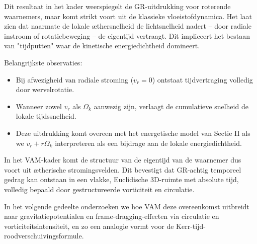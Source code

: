 Dit resultaat in het kader weerspiegelt de GR-uitdrukking voor roterende waarnemers, maar komt strikt voort uit de klassieke vloeistofdynamica. Het laat zien dat naarmate de lokale æthersnelheid de lichtsnelheid nadert – door radiale instroom of rotatiebeweging – de eigentijd vertraagt. Dit impliceert het bestaan van "tijdputten" waar de kinetische energiedichtheid domineert.

Belangrijkste observaties:

\begin{itemize}
\item Bij afwezigheid van radiale stroming (\(v_r = 0\)) ontstaat tijdvertraging volledig door wervelrotatie.
\item Wanneer zowel \(v_r\) als \(\Omega_k\) aanwezig zijn, verlaagt de cumulatieve snelheid de lokale tijdssnelheid.
\item Deze uitdrukking komt overeen met het energetische model van Sectie II als we \(v_r + r\Omega_k\) interpreteren als een bijdrage aan de lokale energiedichtheid.
\end{itemize}

In het VAM-kader komt de structuur van de eigentijd van de waarnemer dus voort uit ætherische stromingsvelden. Dit bevestigt dat GR-achtig temporeel gedrag kan ontstaan in een vlakke, Euclidische 3D-ruimte met absolute tijd, volledig bepaald door gestructureerde vorticiteit en circulatie.

In het volgende gedeelte onderzoeken we hoe VAM deze overeenkomst uitbreidt naar gravitatiepotentialen en frame-dragging-effecten via circulatie en vorticiteitsintensiteit, en zo een analogie vormt voor de Kerr-tijd-roodverschuivingsformule.